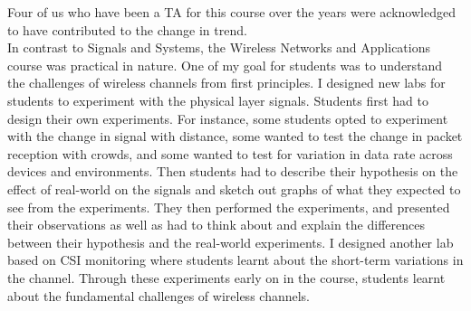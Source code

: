 \documentclass[10pt]{article}
\begin{document}
Four of us who have been a TA for this course over the years were acknowledged to have contributed to the change in trend. \\ 

In contrast to Signals and Systems, the Wireless Networks and Applications course was practical in nature.  %
One of my goal for students was to understand the challenges of wireless channels from first principles. I designed new labs for students to experiment with the physical layer signals. Students first had to design their own experiments. For instance, some students opted to experiment with the change in signal with distance, some wanted to test the change in packet reception with crowds, and some wanted to test for variation in data rate across devices and environments. Then students had to describe their hypothesis on the effect of real-world on the signals and sketch out graphs of what they expected to see from the experiments. They then performed the experiments, and presented their observations as well as had to think about and explain the differences between their hypothesis and the real-world experiments. I designed another lab based on CSI monitoring where students learnt about the short-term variations in the channel. Through these experiments early on in the course, students learnt about the fundamental challenges of wireless channels.
\end{document}
